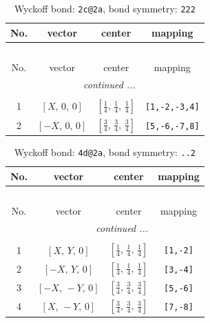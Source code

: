 \documentclass[fleqn,8pt]{jsarticle}
\begin{document}
\renewcommand{\arraystretch}{1.2}
\begin{longtable}{cccc}
\caption{Wyckoff bond: {\tt 2c@2a}, bond symmetry: {\tt 222}}
 \\
 \hline \hline
No. & vector & center & mapping \\ \hline \endfirsthead

\multicolumn{3}{l}{\tablename\ \thetable{}} \\
 \hline \hline
No. & vector & center & mapping \\ \hline \endhead

 \hline \hline
\multicolumn{3}{r}{\footnotesize\it continued ...} \\ \endfoot

 \hline \hline
\multicolumn{3}{r}{} \\ \endlastfoot

1 & $\left[ X,\, 0,\, 0 \right]$ & $\left[ \frac{1}{4},\, \frac{1}{4},\, \frac{1}{4} \right]$ & {\tt [1,-2,-3,4]} \\ \hline
2 & $\left[ - X,\, 0,\, 0 \right]$ & $\left[ \frac{3}{4},\, \frac{3}{4},\, \frac{3}{4} \right]$ & {\tt [5,-6,-7,8]} \\
\end{longtable}
\renewcommand{\arraystretch}{1.2}
\begin{longtable}{cccc}
\caption{Wyckoff bond: {\tt 4d@2a}, bond symmetry: {\tt ..2}}
 \\
 \hline \hline
No. & vector & center & mapping \\ \hline \endfirsthead

\multicolumn{3}{l}{\tablename\ \thetable{}} \\
 \hline \hline
No. & vector & center & mapping \\ \hline \endhead

 \hline \hline
\multicolumn{3}{r}{\footnotesize\it continued ...} \\ \endfoot

 \hline \hline
\multicolumn{3}{r}{} \\ \endlastfoot

1 & $\left[ X,\, Y,\, 0 \right]$ & $\left[ \frac{1}{4},\, \frac{1}{4},\, \frac{1}{4} \right]$ & {\tt [1,-2]} \\ \hline
2 & $\left[ - X,\, Y,\, 0 \right]$ & $\left[ \frac{1}{4},\, \frac{1}{4},\, \frac{1}{4} \right]$ & {\tt [3,-4]} \\ \hline
3 & $\left[ - X,\, - Y,\, 0 \right]$ & $\left[ \frac{3}{4},\, \frac{3}{4},\, \frac{3}{4} \right]$ & {\tt [5,-6]} \\ \hline
4 & $\left[ X,\, - Y,\, 0 \right]$ & $\left[ \frac{3}{4},\, \frac{3}{4},\, \frac{3}{4} \right]$ & {\tt [7,-8]} \\
\end{longtable}
\end{document}
